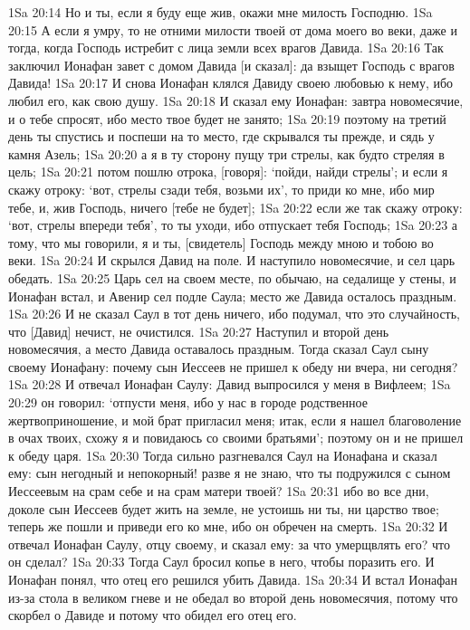 1Sa 20:14  Но и ты, если я буду еще жив, окажи мне милость Господню.
1Sa 20:15  А если я умру, то не отними милости твоей от дома моего во веки, даже и тогда, когда Господь истребит с лица земли всех врагов Давида.
1Sa 20:16  Так заключил Ионафан завет с домом Давида [и сказал]: да взыщет Господь с врагов Давида!
1Sa 20:17  И снова Ионафан клялся Давиду своею любовью к нему, ибо любил его, как свою душу.
1Sa 20:18  И сказал ему Ионафан: завтра новомесячие, и о тебе спросят, ибо место твое будет не занято;
1Sa 20:19  поэтому на третий день ты спустись и поспеши на то место, где скрывался ты прежде, и сядь у камня Азель;
1Sa 20:20  а я в ту сторону пущу три стрелы, как будто стреляя в цель;
1Sa 20:21  потом пошлю отрока, [говоря]: `пойди, найди стрелы'; и если я скажу отроку: `вот, стрелы сзади тебя, возьми их', то приди ко мне, ибо мир тебе, и, жив Господь, ничего [тебе не будет];
1Sa 20:22  если же так скажу отроку: `вот, стрелы впереди тебя', то ты уходи, ибо отпускает тебя Господь;
1Sa 20:23  а тому, что мы говорили, я и ты, [свидетель] Господь между мною и тобою во веки.
1Sa 20:24  И скрылся Давид на поле. И наступило новомесячие, и сел царь обедать.
1Sa 20:25  Царь сел на своем месте, по обычаю, на седалище у стены, и Ионафан встал, и Авенир сел подле Саула; место же Давида осталось праздным.
1Sa 20:26  И не сказал Саул в тот день ничего, ибо подумал, что это случайность, что [Давид] нечист, не очистился.
1Sa 20:27  Наступил и второй день новомесячия, а место Давида оставалось праздным. Тогда сказал Саул сыну своему Ионафану: почему сын Иессеев не пришел к обеду ни вчера, ни сегодня?
1Sa 20:28  И отвечал Ионафан Саулу: Давид выпросился у меня в Вифлеем;
1Sa 20:29  он говорил: `отпусти меня, ибо у нас в городе родственное жертвоприношение, и мой брат пригласил меня; итак, если я нашел благоволение в очах твоих, схожу я и повидаюсь со своими братьями'; поэтому он и не пришел к обеду царя.
1Sa 20:30  Тогда сильно разгневался Саул на Ионафана и сказал ему: сын негодный и непокорный! разве я не знаю, что ты подружился с сыном Иессеевым на срам себе и на срам матери твоей?
1Sa 20:31  ибо во все дни, доколе сын Иессеев будет жить на земле, не устоишь ни ты, ни царство твое; теперь же пошли и приведи его ко мне, ибо он обречен на смерть.
1Sa 20:32  И отвечал Ионафан Саулу, отцу своему, и сказал ему: за что умерщвлять его? что он сделал?
1Sa 20:33  Тогда Саул бросил копье в него, чтобы поразить его. И Ионафан понял, что отец его решился убить Давида.
1Sa 20:34  И встал Ионафан из-за стола в великом гневе и не обедал во второй день новомесячия, потому что скорбел о Давиде и потому что обидел его отец его.

